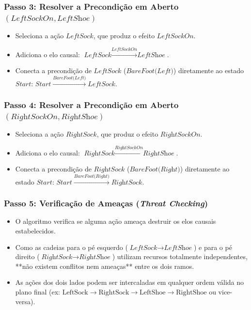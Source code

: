 \documentclass[a4paper,12pt]{article}
\begin{document}
\subsubsection*{Passo 3: Resolver a Precondição em Aberto $(\textit{LeftSockOn}, \textit{LeftShoe})$}
\begin{itemize}
	\item Seleciona a ação $\textit{LeftSock}$, que produz o efeito $\textit{LeftSockOn}$.
	\item Adiciona o elo causal: $\textit{LeftSock} \xrightarrow{\textit{LeftSockOn}} \textit{LeftShoe}$.
	\item Conecta a precondição de $\textit{LeftSock}$ ($\textit{BareFoot(Left)}$) diretamente ao estado $Start$: $Start \xrightarrow{\textit{BareFoot(Left)}} \textit{LeftSock}$.
\end{itemize}

\subsubsection*{Passo 4: Resolver a Precondição em Aberto $(\textit{RightSockOn}, \textit{RightShoe})$}
\begin{itemize}
	\item Seleciona a ação $\textit{RightSock}$, que produz o efeito $\textit{RightSockOn}$.
	\item Adiciona o elo causal: $\textit{RightSock} \xrightarrow{\textit{RightSockOn}} \textit{RightShoe}$.
	\item Conecta a precondição de $\textit{RightSock}$ ($\textit{BareFoot(Right)}$) diretamente ao estado $Start$: $Start \xrightarrow{\textit{BareFoot(Right)}} \textit{RightSock}$.
\end{itemize}

\subsubsection*{Passo 5: Verificação de Ameaças (\textit{Threat Checking})}
\begin{itemize}
	\item O algoritmo verifica se alguma ação ameaça destruir os elos causais estabelecidos.
	\item Como as cadeias para o pé esquerdo ($\textit{LeftSock} \to \textit{LeftShoe}$) e para o pé direito ($\textit{RightSock} \to \textit{RightShoe}$) utilizam recursos totalmente independentes, **não existem conflitos nem ameaças** entre os dois ramos.
	\item As ações dos dois lados podem ser intercaladas em qualquer ordem válida no plano final (ex: $\text{LeftSock} \to \text{RightSock} \to \text{LeftShoe} \to \text{RightShoe}$ ou vice-versa).
\end{itemize}
\end{document}
